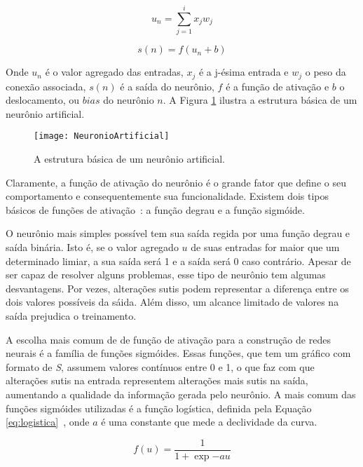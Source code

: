 \begin{equation}
 u_n = \sum_{j=1}^i x_jw_j
\end{equation}

\begin{equation}
s(n) = f(u_n + b)
\end{equation}

Onde $u_n$ é o valor agregado das entradas, $x_j$ é a j-ésima entrada e $w_j$ o peso da conexão associada, $s(n)$ é a saída do neurônio, $f$ é a função de ativação e $b$ o deslocamento, ou $bias$ do neurônio $n$. A Figura \ref{fig:neuroartificial} ilustra a estrutura básica de um neurônio artificial.

\begin{figure}
\centering
\texttt{[image: NeuronioArtificial]}
\caption{A estrutura básica de um neurônio artificial.}
\label{fig:neuroartificial}
\centering
\end{figure}

Claramente, a função de ativação do neurônio é o grande fator que define o seu comportamento e consequentemente sua funcionalidade. Existem dois tipos básicos de funções de ativação~\cite{Haykin}: a função degrau e a função sigmóide.

O neurônio mais simples possível tem sua saída regida por uma função degrau e saída binária. Isto é, se o valor agregado $u$ de suas entradas for maior que um determinado limiar, a sua saída será 1 e a saída será 0 caso contrário. Apesar de ser capaz de resolver alguns problemas, esse tipo de neurônio tem algumas desvantagens. Por vezes, alterações sutis podem representar a diferença entre os dois valores possíveis da sáida. Além disso, um alcance limitado de valores na saída prejudica o treinamento.

A escolha mais comum de de função de ativação para a construção de redes neurais é a família de funções sigmóides. Essas funções, que tem um gráfico com formato de \textit{S}, assumem valores contínuos entre 0 e 1, o que faz com que alterações sutis na entrada representem alterações mais sutis na saída, aumentando a qualidade da informação gerada pelo neurônio. A mais comum das funções sigmóides utilizadas é a função logística, definida pela Equação \ref{eq:logistica}~\cite{Kosabov}, onde $a$ é uma constante que mede a declividade da curva.

\begin{equation}
	f(u) = \frac{1}{1 + \exp{-au}}
\label{eq:logistica}
\end{equation}

